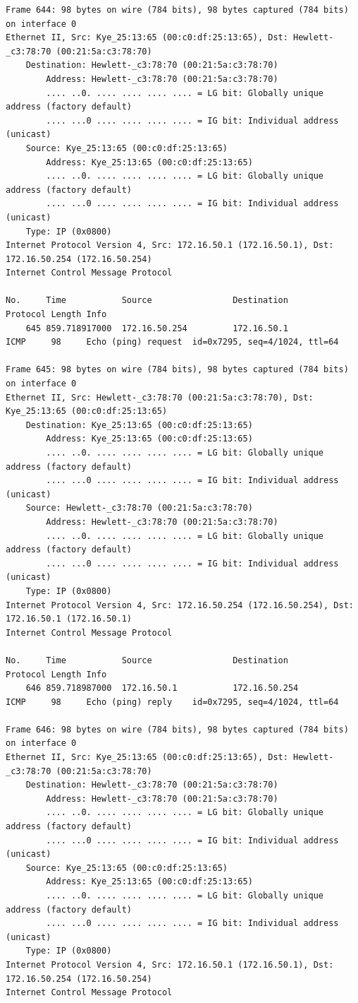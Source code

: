 \documentclass[a4paper,11pt]{article}
\begin{document}
\begin{lstlisting}
Frame 644: 98 bytes on wire (784 bits), 98 bytes captured (784 bits) on interface 0
Ethernet II, Src: Kye_25:13:65 (00:c0:df:25:13:65), Dst: Hewlett-_c3:78:70 (00:21:5a:c3:78:70)
    Destination: Hewlett-_c3:78:70 (00:21:5a:c3:78:70)
        Address: Hewlett-_c3:78:70 (00:21:5a:c3:78:70)
        .... ..0. .... .... .... .... = LG bit: Globally unique address (factory default)
        .... ...0 .... .... .... .... = IG bit: Individual address (unicast)
    Source: Kye_25:13:65 (00:c0:df:25:13:65)
        Address: Kye_25:13:65 (00:c0:df:25:13:65)
        .... ..0. .... .... .... .... = LG bit: Globally unique address (factory default)
        .... ...0 .... .... .... .... = IG bit: Individual address (unicast)
    Type: IP (0x0800)
Internet Protocol Version 4, Src: 172.16.50.1 (172.16.50.1), Dst: 172.16.50.254 (172.16.50.254)
Internet Control Message Protocol

No.     Time           Source                Destination           Protocol Length Info
    645 859.718917000  172.16.50.254         172.16.50.1           ICMP     98     Echo (ping) request  id=0x7295, seq=4/1024, ttl=64

Frame 645: 98 bytes on wire (784 bits), 98 bytes captured (784 bits) on interface 0
Ethernet II, Src: Hewlett-_c3:78:70 (00:21:5a:c3:78:70), Dst: Kye_25:13:65 (00:c0:df:25:13:65)
    Destination: Kye_25:13:65 (00:c0:df:25:13:65)
        Address: Kye_25:13:65 (00:c0:df:25:13:65)
        .... ..0. .... .... .... .... = LG bit: Globally unique address (factory default)
        .... ...0 .... .... .... .... = IG bit: Individual address (unicast)
    Source: Hewlett-_c3:78:70 (00:21:5a:c3:78:70)
        Address: Hewlett-_c3:78:70 (00:21:5a:c3:78:70)
        .... ..0. .... .... .... .... = LG bit: Globally unique address (factory default)
        .... ...0 .... .... .... .... = IG bit: Individual address (unicast)
    Type: IP (0x0800)
Internet Protocol Version 4, Src: 172.16.50.254 (172.16.50.254), Dst: 172.16.50.1 (172.16.50.1)
Internet Control Message Protocol

No.     Time           Source                Destination           Protocol Length Info
    646 859.718987000  172.16.50.1           172.16.50.254         ICMP     98     Echo (ping) reply    id=0x7295, seq=4/1024, ttl=64

Frame 646: 98 bytes on wire (784 bits), 98 bytes captured (784 bits) on interface 0
Ethernet II, Src: Kye_25:13:65 (00:c0:df:25:13:65), Dst: Hewlett-_c3:78:70 (00:21:5a:c3:78:70)
    Destination: Hewlett-_c3:78:70 (00:21:5a:c3:78:70)
        Address: Hewlett-_c3:78:70 (00:21:5a:c3:78:70)
        .... ..0. .... .... .... .... = LG bit: Globally unique address (factory default)
        .... ...0 .... .... .... .... = IG bit: Individual address (unicast)
    Source: Kye_25:13:65 (00:c0:df:25:13:65)
        Address: Kye_25:13:65 (00:c0:df:25:13:65)
        .... ..0. .... .... .... .... = LG bit: Globally unique address (factory default)
        .... ...0 .... .... .... .... = IG bit: Individual address (unicast)
    Type: IP (0x0800)
Internet Protocol Version 4, Src: 172.16.50.1 (172.16.50.1), Dst: 172.16.50.254 (172.16.50.254)
Internet Control Message Protocol


\end{lstlisting}
\end{document}
